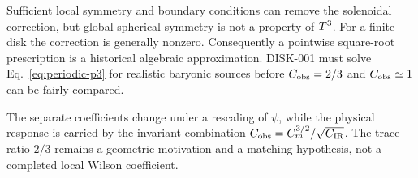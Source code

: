 Sufficient local symmetry and boundary conditions can remove the solenoidal
correction, but global spherical symmetry is not a property of $T^3$.
For a finite disk the correction is generally nonzero.
Consequently a pointwise square-root prescription is a
historical algebraic approximation.  DISK-001 must solve
Eq.~\eqref{eq:periodic-p3} for realistic baryonic sources before
$C_{\rm obs}=2/3$ and $C_{\rm obs}\simeq1$ can be fairly compared.

The separate coefficients change under a rescaling of $\psi$, while the
physical response is carried by the invariant combination
$C_{\rm obs}=C_m^{3/2}/\sqrt{C_{\rm IR}}$.  The trace ratio $2/3$ remains a
geometric motivation and a matching hypothesis, not a completed local Wilson
coefficient.
